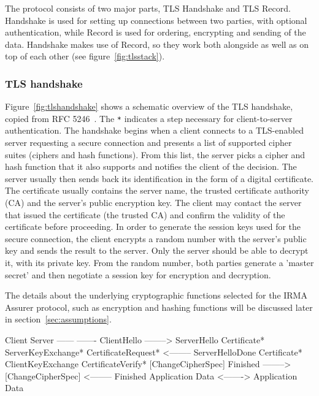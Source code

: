 The protocol consists of two major parts, TLS Handshake and TLS Record. Handshake is used for setting up connections between two parties, with optional authentication, while Record is used for ordering, encrypting and sending of the data. Handshake makes use of Record, so they work both alongside as well as on top of each other (see figure~\ref{fig:tlsstack}).



\subsubsection{TLS handshake}
Figure~\ref{fig:tlshandshake} shows a schematic overview of the TLS handshake, copied from RFC 5246~\cite{tls1.2}. The \texttt{*} indicates a step necessary for client-to-server authentication. The handshake begins when a client connects to a TLS-enabled server requesting a secure connection and presents a list of supported cipher suites (ciphers and hash functions). From this list, the server picks a cipher and hash function that it also supports and notifies the client of the decision. The server usually then sends back its identification in the form of a digital certificate. The certificate usually contains the server name, the trusted certificate authority (CA) and the server's public encryption key. The client may contact the server that issued the certificate (the trusted CA) and confirm the validity of the certificate before proceeding. In order to generate the session keys used for the secure connection, the client encrypts a random number with the server's public key and sends the result to the server. Only the server should be able to decrypt it, with its private key. From the random number, both parties generate a 'master secret' and then negotiate a session key for encryption and decryption.

The details about the underlying cryptographic functions selected for the IRMA Assurer protocol, such as encryption and hashing functions will be discussed later in section~\ref{sec:assumptions}.

\begin{verbbox}
Client                                               Server
------                                              -------
ClientHello              -------->
                                                ServerHello
                                               Certificate*
                                         ServerKeyExchange*
                                        CertificateRequest*
                         <--------          ServerHelloDone
Certificate*
ClientKeyExchange
CertificateVerify*
[ChangeCipherSpec]
Finished                 -------->
                                         [ChangeCipherSpec]
                         <--------                 Finished
Application Data         <------->         Application Data
\end{verbbox}

